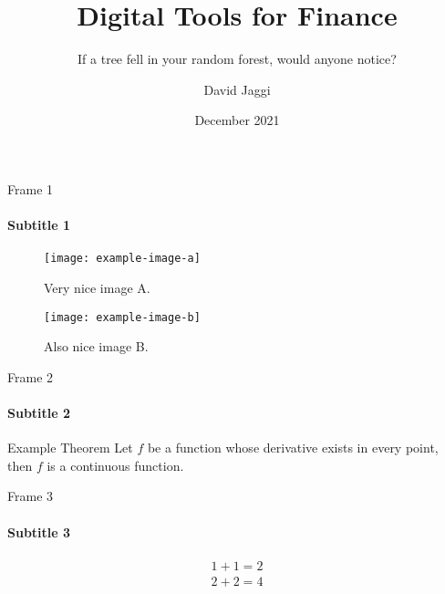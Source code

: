 \documentclass[10pt,aspectratio=169]{beamer}
\title{Digital Tools for Finance}
\subtitle{If a tree fell in your random forest, would anyone notice?}
\author{David Jaggi}
\institute{University of Zurich}
\date{December 2021}
\begin{document}
\frame{\titlepage}
\begin{frame}{Frame 1}
    \framesubtitle{Subtitle 1}
    \begin{figure}
    \centering
        \begin{minipage}{.45\textwidth}
          \centering
          \texttt{[image: example-image-a]}
          \caption{Very nice image A.}
          \label{fig:test-a}
        \end{minipage}%
        \begin{minipage}{.45\textwidth}
          \centering
          \texttt{[image: example-image-b]}
          \caption{Also nice image B.}
          \label{fig:test-b}
        \end{minipage}
    \end{figure}
\end{frame}
\begin{frame}{Frame 2}
    \framesubtitle{Subtitle 2}
    \begin{theorem}{Example Theorem}
        Let \(f\) be a function whose derivative exists in every point, then \(f\) 
        is a continuous function.
    \end{theorem}
\end{frame}
\begin{frame}{Frame 3}
    \framesubtitle{Subtitle 3}
        \begin{gather}
            1+1=2 \\
            2+2=4
        \end{gather}
\end{frame}
\end{document}
